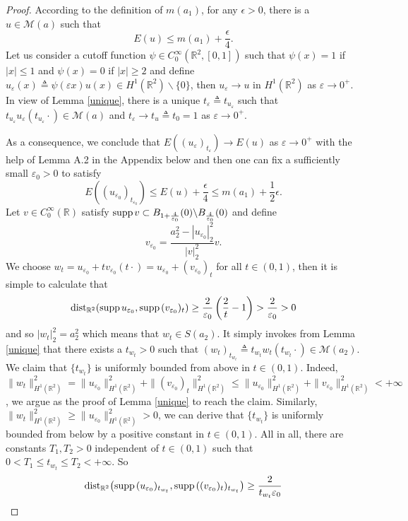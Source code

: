 \documentclass[11pt]{amsart}
\numberwithin{equation}{section}
\theoremstyle{definition}
\newcommand{\R}{\mathbb{R}}
\newcommand{\supp}{{\rm supp}{\hspace{.05cm}}}
\begin{document}
\begin{proof}
According to the definition of $m(a_1)$, for any $\epsilon>0$,
there is a $u\in \mathcal{M}(a)$ such that
\[
E(u)\leq m(a_1)+\frac\epsilon4.
\]
Let us
consider a cutoff function $\psi\in C_0^\infty(\R^2,[0,1])$ such that $\psi(x)=1$
if $|x|\leq1$ and $\psi(x)=0$
if $|x|\geq2$ and define $u_\varepsilon(x)\triangleq \psi(\varepsilon x)u(x)\in H^1(\R^2)\backslash\{0\}$,
then $u_\varepsilon \to u$ in $H^1(\R^2)$ as $\varepsilon\to0^+$.
In view of Lemma \ref{unique}, there is a unique $t_\varepsilon\triangleq t_{u_\varepsilon}$ such that
$t_{u_\varepsilon} u_\varepsilon(t_{u_\varepsilon}\cdot)\in \mathcal{M}(a)$
and $t_\varepsilon\to t_u\triangleq t_0=1$ as $\varepsilon\to0^+$.

As a consequence, we conclude that $E((u_\varepsilon)_{t_\varepsilon})\to E(u)$ as $\varepsilon\to0^+$ with the help of
 Lemma A.2 in the Appendix below and then one can
fix a sufficiently small $\varepsilon_0>0$ to satisfy
\[
E((u_{\varepsilon_0})_{t_{\varepsilon_0}})\leq E(u)+\frac\epsilon4\leq m(a_1)+\frac 12\epsilon.
\]
Let $v\in C_0^\infty(\mathbb{R})$ satisfy $\supp v \subset B_{1+\frac{4}{\varepsilon_0}}(0)\backslash B_{\frac{4}{\varepsilon_0}}(0)$
and define
\[
v_{\varepsilon_0}=\frac{a_2^2- |u_{\varepsilon_0} |_2^2}{ |v |_2^2}v.
\]
We choose $w_t=u_{\varepsilon_0}+t v_{\varepsilon_0}(t\cdot )=u_{\varepsilon_0}+(v_{\varepsilon_0})_t$ for all $t\in(0,1)$,
then it is simple to calculate that
\[
\text{dist}_{\R^2}(\supp u_{\varepsilon_0},\supp (v_{\varepsilon_0})_t)\geq \frac2{\varepsilon_0}
\left(\frac2t-1\right)>\frac2{\varepsilon_0}>0
\]
and so $|w_t|_2^2=a_2^2$ which means that
$w_t\in S(a_2)$. It simply invokes from Lemma \ref{unique} that there exists a
$t_{w_t}>0$ such that $(w_t)_{t_{w_t}}\triangleq t_{w_t}w_t(t_{w_t}\cdot)\in \mathcal{M}(a_2)$.
We claim that $\{t_{w_t}\}$ is uniformly bounded from above in $t\in(0,1)$.
Indeed, $\|w_t\|^2_{H^1(\R^2)}=\|u_{\varepsilon_0}\|^2_{H^1(\R^2)}+\|(v_{\varepsilon_0})_t\|^2_{H^1(\R^2)}
\leq \|u_{\varepsilon_0}\|^2_{H^1(\R^2)}+\|v_{\varepsilon_0} \|^2_{H^1(\R^2)}<+\infty$, we argue as the proof of Lemma \ref{unique}
to reach the claim. Similarly, $\|w_t\|^2_{H^1(\R^2)}\geq\|u_{\varepsilon_0}\|^2_{H^1(\R^2)}>0$,
we can derive that $\{t_{w_t}\}$ is uniformly bounded from below by a positive constant in $t\in(0,1)$.
All in all, there are constants $T_1,T_2>0$ independent of $t\in(0,1)$ such that
$0<T_1\leq t_{w_t}\leq T_2<+\infty$. So
 \[
\text{dist}_{\R^2}\big(\supp (u_{\varepsilon_0})_{t_{w_t}},\supp ((v_{\varepsilon_0})_t)_{t_{w_t}}\big)\geq \frac2{t_{w_t}\varepsilon_0}
\]
\end{proof}
\end{document}
